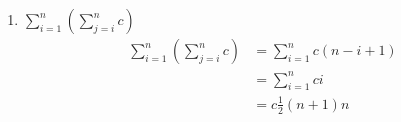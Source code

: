 \documentclass[paper=a4, fontsize=11pt]{scrartcl}
\DeclarePairedDelimiter\floor{\lfloor}{\rfloor}
\DeclarePairedDelimiter\ceil{\lceil}{\rceil}
\numberwithin{equation}{section}		%
\numberwithin{figure}{section}			%
\numberwithin{table}{section}				%
\begin{document}
\begin{enumerate}
\begin{enumerate}
%
%
%
%
%

\item
$\displaystyle\sum_{i=1}^{n}\left(\sum_{j=i}^{n}c\right)$
\begin{align*}
	\sum_{i=1}^{n}\left(\sum_{j=i}^{n}c\right) &= \sum_{i=1}^{n}c(n-i+1) \\
	&= \sum_{i=1}^{n}ci \\
	&= c\frac{1}{2}(n+1)n
\end{align*}

%



\end{enumerate}
\end{enumerate}
\end{document}
